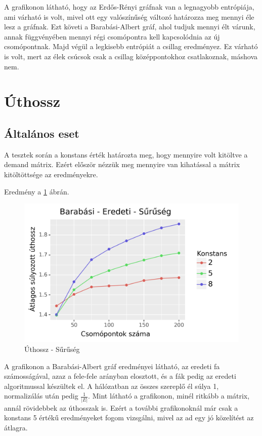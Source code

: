 \documentclass[12pt]{report}
\begin{document}
A grafikonon látható, hogy az Erdős-Rényi gráfnak van a legnagyobb entrópiája, ami várható is volt, mivel ott egy valószínűség változó határozza meg mennyi éle lesz a gráfnak.
Ezt követi a Barabási-Albert gráf, ahol tudjuk mennyi élt várunk, annak függvényében mennyi régi csomópontra kell kapcsolódnia az új csomópontnak.
Majd végül a legkisebb entrópiát a csillag eredményez.
Ez várható is volt, mert az élek csúcsok csak a csillag középpontokhoz csatlakoznak, máshova nem.

\section{Úthossz}

\subsection{Általános eset}

A tesztek során a konstans érték határozta meg, hogy mennyire volt kitöltve a demand mátrix.
Ezért először nézzük meg mennyire van kihatással a mátrix kitöltöttsége az eredményekre.

Eredmény a \ref{density-len} ábrán.

\begin{figure}[H]
	\begin{center}
		\includegraphics[width=0.9\linewidth]{pictures/density_len.png}
		\caption{Úthossz - Sűrűség}
		\label{density-len}
	\end{center}
\end{figure}

A grafikonon a Barabási-Albert gráf eredményei látható, az eredeti fa számosságával, azaz a fele-fele arányban elosztott, és a fák pedig az eredeti algoritmussal készültek el.
A hálózatban az összes szereplő él súlya 1, normalizálás után pedig
\(\frac{1}{|E|}\).
Mint látható a grafikonon, minél ritkább a mátrix, annál rövidebbek az úthosszak is.
Ezért a további grafikonoknál már csak a konstans 5 értékű eredményeket fogom vizsgálni, mivel az ad egy jó közelítést az átlagra.
\end{document}

